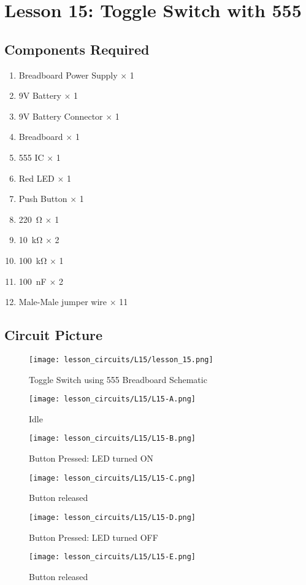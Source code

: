 \section{Lesson 15: Toggle Switch with 555}
\subsection{Components Required}
\begin{enumerate}
    \item Breadboard Power Supply $\times$ 1
    \item 9V Battery $\times$ 1
    \item 9V Battery Connector $\times$ 1
    \item Breadboard $\times$ 1
    \item 555 IC $\times$ 1
    \item Red LED $\times$ 1
    \item Push Button $\times$ 1
    \item \SI{220}{\ohm} $\times$ 1
    \item \SI{10}{\kilo\ohm} $\times$ 2
    \item \SI{100}{\kilo\ohm} $\times$ 1
    \item \SI{100}{\nano\farad} $\times$ 2
    \item Male-Male jumper wire $\times$ 11
\end{enumerate}
\subsection{Circuit Picture}
\begin{figure}[!h]
    \centering
    \texttt{[image: lesson\_circuits/L15/lesson\_15.png]}
    \caption{Toggle Switch using 555 Breadboard Schematic}
    \label{fig:555_ts_sch}
\end{figure}
\begin{figure}[!h]
    \centering
    \texttt{[image: lesson\_circuits/L15/L15-A.png]}
    \caption{Idle}
    \label{fig:555_ts_obb}
\end{figure}
\begin{figure}[!h]
    \centering
    \texttt{[image: lesson\_circuits/L15/L15-B.png]}
    \caption{Button Pressed: LED turned ON}
    \label{fig:555_ts_obb1}
\end{figure}
\begin{figure}[!h]
    \centering
    \texttt{[image: lesson\_circuits/L15/L15-C.png]}
    \caption{Button released}
    \label{fig:555_ts_obb2}
\end{figure}
\begin{figure}[!h]
    \centering
    \texttt{[image: lesson\_circuits/L15/L15-D.png]}
    \caption{Button Pressed: LED turned OFF}
    \label{fig:555_ts_obb3}
\end{figure}
\begin{figure}[!h]
    \centering
    \texttt{[image: lesson\_circuits/L15/L15-E.png]}
    \caption{Button released}
    \label{fig:555_ts_obb4}
\end{figure}
